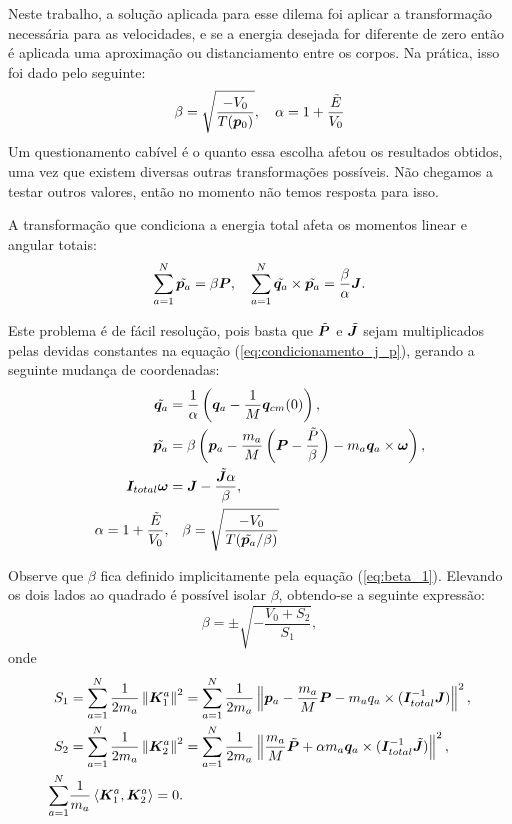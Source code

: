 Neste trabalho, a solução aplicada para esse dilema foi aplicar a transformação necessária para as velocidades, e se a energia desejada for diferente de zero então é aplicada uma aproximação ou distanciamento entre os corpos. Na prática, isso foi dado pelo seguinte:
\begin{equation*}
    \beta = \sqrt{\dfrac{-V_0}{T(\bm p_0)}},
    \quad
    \alpha = 1 + \dfrac{\tilde E}{V_0}
\end{equation*}
Um questionamento cabível é o quanto essa escolha afetou os resultados obtidos, uma vez que existem diversas outras transformações possíveis. Não chegamos a testar outros valores, então no momento não temos resposta para isso. 

A transformação que condiciona a energia total afeta os momentos linear e angular totais:
\begin{equation*}
    \sum_{a=1}^{N} \tilde{\bm p_a} = \beta \bm P,
    \quad
    \sum_{a=1}^{N} \tilde{\bm q_a} \times \tilde{\bm p_a} = \dfrac{\beta}{\alpha} \bm J.
\end{equation*}

Este problema é de fácil resolução, pois basta que $\tilde{\bm P}$ e $\tilde{\bm J}$ sejam multiplicados pelas devidas constantes na equação (\ref{eq:condicionamento_j_p}), gerando a seguinte mudança de coordenadas:
\begin{align}
    \tilde{\bm q_a} &= \dfrac{1}{\alpha}\left(\bm q_a - \dfrac{1}{M} \bm q_{cm} (0)\right), \\
    \tilde{\bm p_a} &= \beta\left( \bm p_a - \dfrac{m_a}{M} \left(\bm P - \dfrac{\tilde P}{\beta}\right) - m_a \bm q_a \times \bm \omega \right), \\
    \bm I_{total} \bm \omega &= \bm J - \dfrac{\tilde{\bm J} \alpha}{\beta}, \\
    \alpha = 1 + \dfrac{\tilde E}{V_0}, 
    & \quad
    \label{eq:beta_1} \beta = \sqrt{\dfrac{- V_0}{T( \tilde{\bm p_a} / \beta)}}
\end{align}

Observe que $\beta$ fica definido implicitamente pela equação (\ref{eq:beta_1}). Elevando os dois lados ao quadrado é possível isolar $\beta$, obtendo-se a seguinte expressão:
\begin{equation}
    \beta = \pm \sqrt{- \dfrac{V_0 + S_2}{S_1}},
\end{equation}
onde
\begin{align*}
    S_1 &= \sum_{a=1}^{N} \dfrac{1}{2 m_a} \left\Vert \bm K_1^a \right\Vert^2 
    = \sum_{a=1}^{N} \dfrac{1}{2 m_a} \left\Vert \bm p_a - \dfrac{m_a}{M} \bm P - m_a q_a \times (\bm I_{total}^{-1} \bm J) \right\Vert^2, 
    \\
    S_2 &= \sum_{a=1}^{N} \dfrac{1}{2 m_a} \left\Vert \bm K_2^a \right\Vert^2
    = \sum_{a=1}^{N} \dfrac{1}{2 m_a} \left\Vert \dfrac{m_a}{M} \tilde{\bm P} + \alpha m_a \bm q_a \times (\bm I_{total}^{-1} \tilde{\bm J}) \right\Vert^2,
    \\
    \sum_{a=1}^{N} & \dfrac{1}{m_a} \left\langle \bm K_1^a, \bm K_2^a \right\rangle = 0.
\end{align*}

